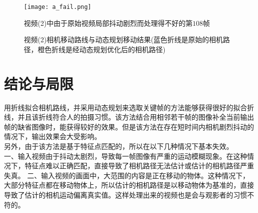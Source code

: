 \documentclass[journal, a4paper]{IEEEtran}
\begin{document}
    \begin{figure}[!hbt]
        \begin{center}
        \texttt{[image: a\_fail.png]}
        \caption{视频(2)中由于原始视频局部抖动剧烈而处理得不好的第$108$帧}
        \label{fig:a_fail}
        \end{center}
    \end{figure}
    
    \begin{figure}[!hbt]
      \begin{center}
          \caption{视频(2)相机移动路线与动态规划移动结果(蓝色折线是原始的相机路径，橙色折线是经动态规划优化后的相机路径)}
          \label{fig:DP_motion_a}
      \end{center}
    \end{figure}
    
\section{结论与局限}
    用折线拟合相机路线，并采用动态规划来选取关键帧的方法能够获得很好的拟合折线，并且该折线符合人的拍摄习惯。该方法结合用相邻若干帧的图像补全当前输出帧的缺省图像时，能获得较好的效果。但是该方法在存在短时间内相机剧烈抖动的情况下，输出效果会大受影响。\\
    
    另外，由于该方法是基于特征点匹配的，所以在以下几种情况下基本失效。\\
    一、输入视频由于抖动太剧烈，导致每一帧图像有严重的运动模糊现象。在这种情况下，特征点难以正确匹配，直接导致了相机路径无法估计或估计的相机路径严重失真。
    二、输入视频的画面中，大范围的内容是正在移动的物体。这种情况下，大部分特征点都在移动物体上，所以估计的相机路径是以移动物体为基准的，直接导致了估计的相机运动偏离真实值。这样处理出来的视频也是会与观影者的习惯不符的。
\end{document}
